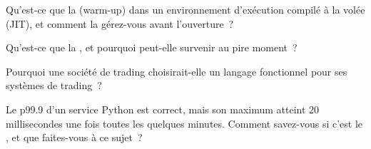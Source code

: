 \begin{interviewq}\label{iq:ll:managed-and-functional-languages-on-the-desk:3}
Qu'est-ce que la  (warm-up) dans un environnement d'exécution compilé à la volée (JIT), et comment la gérez-vous avant l'ouverture~?
\end{interviewq}

\begin{interviewq}\label{iq:ll:managed-and-functional-languages-on-the-desk:4}
Qu'est-ce que la , et pourquoi peut-elle survenir au pire moment~?
\end{interviewq}

\begin{interviewq}\label{iq:ll:managed-and-functional-languages-on-the-desk:5}
Pourquoi une société de trading choisirait-elle un langage fonctionnel pour ses systèmes de trading~?
\end{interviewq}

\begin{interviewq}\label{iq:ll:managed-and-functional-languages-on-the-desk:6}
Le p99.9 d'un service Python est correct, mais son maximum atteint 20 millisecondes une fois toutes les quelques minutes. Comment savez-vous si
c'est le , et que faites-vous à ce sujet~?
\end{interviewq}
